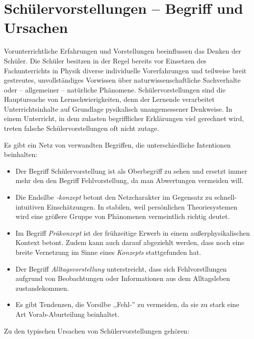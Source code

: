 \bip\bip
\section{Sch{\"u}lervorstellungen --  Begriff und Ursachen}
Vorunterrichtliche Erfahrungen und Vorstellungen beeinflussen das Denken der Schüler. Die Schüler besitzen in der Regel bereits vor Einsetzen des Fachunterrichts in Physik diverse individuelle Vorerfahrungen und teilweise breit gestreutes, unvollst{\"a}ndiges Vorwissen {\"u}ber naturwissenschaftliche Sachverhalte oder -- allgemeiner -- nat{\"u}rliche Ph{\"a}nomene. Sch{\"u}lervorstellungen sind die Hauptursache von Lernschwierigkeiten, denn der Lernende verarbeitet Unterrichtsinhalte auf Grundlage pysikalisch unangemessener Denkweise. In einem Unterricht, in dem zulasten begrifflicher Erkl{\"a}rungen viel gerechnet wird, treten falsche Sch{\"u}lervorstellungen oft nicht zutage. 

Es gibt ein Netz von verwandten Begriffen, die unterschiedliche Intentionen beinhalten:

\begin{itemize}
	\item Der Begriff Sch{\"u}lervorstellung ist als Oberbegriff zu sehen und ersetzt immer mehr den den Begriff Fehlvorstellung, da man Abwertungen vermeiden will. 
	\item Die Endsilbe \emph{-konzept} betont den Netzcharakter im Gegensatz zu schnell-intuitiven Einsch\"{a}tzungen. In stabilen, weil  pers\"{o}nlichen
	Theoriesystemen wird eine gr\"{o}{\ss}ere Gruppe von Ph\"{a}nomenen vermeintlich richtig deutet.
	\item
	Im Begriff \emph{Pr\"{a}konzept} ist der fr\"{u}hzeitige Erwerb in einem au{\ss}erphysikalischen Kontext betont. Zudem kann auch darauf abgeziehlt werden, dass noch eine breite Vernetzung im Sinne eines  \emph{Konzepts} stattgefunden hat. 
	\item
	Der Begriff \emph{Alltagsvorstellung} unterstreicht, dass sich Fehlvorstllungen aufgrund von Beobachtungen
	oder Informationen aus dem Alltagsleben zustandekommen.
	\item
	Es gibt Tendenzen, die Vorsilbe ,,Fehl-'' zu vermeiden, da sie zu stark eine Art Vorab-Aburteilung beinhaltet.
\end{itemize}

\bip


Zu den typischen Ursachen von Sch{\"u}lervorstellungen geh{\"o}ren:

